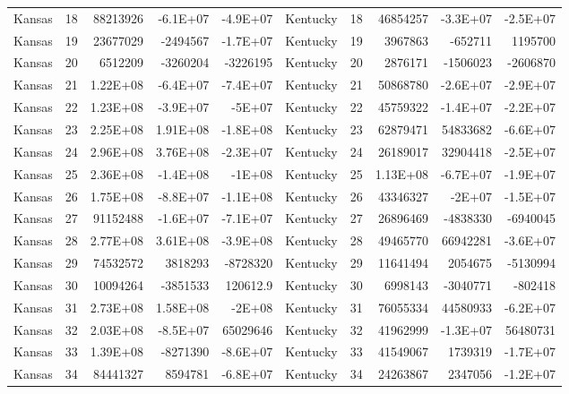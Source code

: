 \begin{table}[]
\begin{tabular}{lrrrrlrrrr}
		Kansas &  18 & 88213926 & -6.1E+07 & -4.9E+07 & Kentucky &  18 & 46854257 & -3.3E+07 & -2.5E+07 \\
		Kansas &  19 & 23677029 & -2494567 & -1.7E+07 & Kentucky &  19 & 3967863 & -652711 & 1195700 \\
		Kansas &  20 & 6512209 & -3260204 & -3226195 & Kentucky &  20 & 2876171 & -1506023 & -2606870 \\
		Kansas &  21 & 1.22E+08 & -6.4E+07 & -7.4E+07 & Kentucky &  21 & 50868780 & -2.6E+07 & -2.9E+07 \\
		Kansas &  22 & 1.23E+08 & -3.9E+07 & -5E+07 & Kentucky &  22 & 45759322 & -1.4E+07 & -2.2E+07 \\
		Kansas &  23 & 2.25E+08 & 1.91E+08 & -1.8E+08 & Kentucky &  23 & 62879471 & 54833682 & -6.6E+07 \\
		Kansas &  24 & 2.96E+08 & 3.76E+08 & -2.3E+07 & Kentucky &  24 & 26189017 & 32904418 & -2.5E+07 \\
		Kansas &  25 & 2.36E+08 & -1.4E+08 & -1E+08 & Kentucky &  25 & 1.13E+08 & -6.7E+07 & -1.9E+07 \\
		Kansas &  26 & 1.75E+08 & -8.8E+07 & -1.1E+08 & Kentucky &  26 & 43346327 & -2E+07 & -1.5E+07 \\
		Kansas &  27 & 91152488 & -1.6E+07 & -7.1E+07 & Kentucky &  27 & 26896469 & -4838330 & -6940045 \\
		Kansas &  28 & 2.77E+08 & 3.61E+08 & -3.9E+08 & Kentucky &  28 & 49465770 & 66942281 & -3.6E+07 \\
		Kansas &  29 & 74532572 & 3818293 & -8728320 & Kentucky &  29 & 11641494 & 2054675 & -5130994 \\
		Kansas &  30 & 10094264 & -3851533 & 120612.9 & Kentucky &  30 & 6998143 & -3040771 & -802418 \\
		Kansas &  31 & 2.73E+08 & 1.58E+08 & -2E+08 & Kentucky &  31 & 76055334 & 44580933 & -6.2E+07 \\
		Kansas &  32 & 2.03E+08 & -8.5E+07 & 65029646 & Kentucky &  32 & 41962999 & -1.3E+07 & 56480731 \\
		Kansas &  33 & 1.39E+08 & -8271390 & -8.6E+07 & Kentucky &  33 & 41549067 & 1739319 & -1.7E+07 \\
		Kansas &  34 & 84441327 & 8594781 & -6.8E+07 & Kentucky &  34 & 24263867 & 2347056 & -1.2E+07
	\end{tabular}
\end{table}

